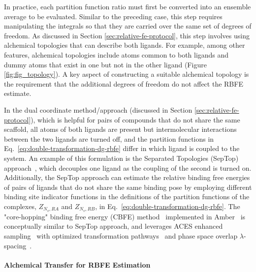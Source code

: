 \documentclass[9pt,bestpractices]{livecoms}
\begin{document}
In practice, each partition function ratio must first be converted into an ensemble average to be evaluated. Similar to the preceding case, this step requires manipulating the integrals so that they are carried over the same set of degrees of freedom. As discussed in Section \ref{sec:relative-fe-protocol}, this step involves using alchemical topologies that can describe both ligands. For example, among other features, alchemical topologies include atoms common to both ligands and dummy atoms that exist in one but not in the other ligand (Figure \ref{fig:fig_topology}). A key aspect of constructing a suitable alchemical topology is the requirement that the additional degrees of freedom do not affect the RBFE estimate.

In the dual coordinate method/approach (discussed in Section \ref{sec:relative-fe-protocol}), which is helpful for pairs of compounds that do not share the same scaffold, all atoms of both ligands are present but intermolecular interactions between the two ligands are turned off, and the partition functions in Eq.~\ref{eq:double-transformation-dg-rbfe} differ in which ligand is coupled to the system. An example of this formulation is the Separated Topologies (SepTop) approach~\cite{rocklin2013separated,baumann2023broadening}, which decouples one ligand as the coupling of the second is turned on. Additionally, the SepTop approach can estimate the relative binding free energies of pairs of ligands that do not share the same binding pose by employing different binding site indicator functions in the definitions of the partition functions of the complexes, $Z_{N_v,RA}$ and $Z_{N_v,RB}$, in Eq.~\ref{eq:double-transformation-dg-rbfe}.
The "core-hopping" binding free energy (CBFE) method~\cite{Tsai_JChemInfModel_2026_v66_p1626} implemented in Amber~\cite{Case_JChemInfModel_2025_v65_p7835} is conceptually similar to SepTop approach, and leverages ACES enhanced sampling~\cite{lee2023aces,tsai_jcheminfmodel_2024_v64_p7046} with optimized transformation pathways~\cite{Tsai_JChemTheoryComput_2023_v19_p640} and phase space overlap $\lambda$-spacing~\cite{zhang_jchemtheorycomput_2024_v20_p3935}.


\paragraph{Alchemical Transfer for RBFE Estimation}
\end{document}
